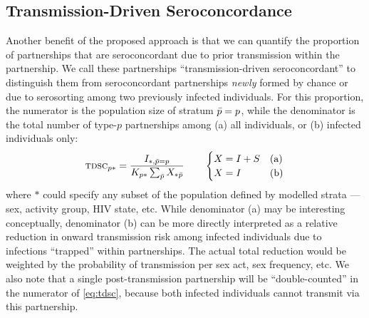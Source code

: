 \subsection{Transmission-Driven Seroconcordance}\label{foi.prop.tdsc}
Another benefit of the proposed approach is that
we can quantify the proportion of partnerships that are seroconcordant
due to prior transmission within the partnership.
We call these partnerships ``transmission-driven seroconcordant''  %
to distinguish them from seroconcordant partnerships \emph{newly} formed
by chance or due to serosorting \cite{Purcell2017,Kim2020}
among two previously infected individuals.
For this proportion,
the numerator is the population size of stratum $\bar{p}=p$, while
the denominator is the total number of type-$p$ partnerships among
(a) all individuals, or (b) infected individuals only:
\begin{equation}\label{eq:tdsc}
  \textsc{tdsc}_{p*} = \frac{I_{*,\bar{p}=p}}{K_{p*} \sum_{\bar{p}} X_{*\bar{p}}}
  \qquad
  \begin{cases}
    X = I + S & \textnormal{(a)} \\
    X = I     & \textnormal{(b)} \\
  \end{cases}
\end{equation}
where $*$ could specify any subset of the population
defined by modelled strata --- \eg sex, activity group, HIV state, etc.
While denominator (a) may be interesting conceptually,
denominator (b) can be more directly interpreted as
a relative reduction in onward transmission risk among infected individuals
due to infections ``trapped'' within partnerships.
The actual total reduction would be weighted by
the probability of transmission per sex act, sex frequency, etc.
We also note that a single post-transmission partnership
will be ``double-counted'' in the numerator of \eqref{eq:tdsc},
because both infected individuals cannot transmit via this partnership.
